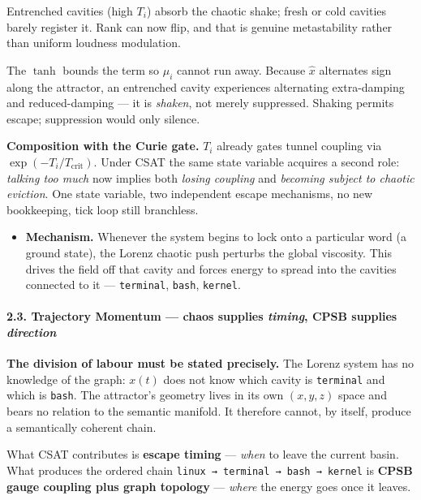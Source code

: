 \documentclass[
  11pt,
  a4paper,
]{article}
\providecommand{\tightlist}{%
  \setlength{\itemsep}{0pt}\setlength{\parskip}{0pt}}
\begin{document}
Entrenched cavities (high \(T_i\)) absorb the chaotic shake; fresh or
cold cavities barely register it. Rank can now flip, and that is genuine
metastability rather than uniform loudness modulation.

The \(\tanh\) bounds the term so \(\mu_i\) cannot run away. Because
\(\hat{x}\) alternates sign along the attractor, an entrenched cavity
experiences alternating extra-damping and reduced-damping --- it is
\emph{shaken}, not merely suppressed. Shaking permits escape;
suppression would only silence.

\textbf{Composition with the Curie gate.} \(T_i\) already gates tunnel
coupling via \(\exp(-T_i/T_{\text{crit}})\). Under CSAT the same state
variable acquires a second role: \emph{talking too much} now implies
both \emph{losing coupling} and \emph{becoming subject to chaotic
eviction}. One state variable, two independent escape mechanisms, no new
bookkeeping, tick loop still branchless.

\begin{itemize}
\tightlist
\item
  \textbf{Mechanism.} Whenever the system begins to lock onto a
  particular word (a ground state), the Lorenz chaotic push perturbs the
  global viscosity. This drives the field off that cavity and forces
  energy to spread into the cavities connected to it ---
  \texttt{terminal}, \texttt{bash}, \texttt{kernel}.
\end{itemize}

\paragraph{\texorpdfstring{2.3. Trajectory Momentum --- chaos supplies
\emph{timing}, CPSB supplies
\emph{direction}}{2.3. Trajectory Momentum --- chaos supplies timing, CPSB supplies direction}}\label{trajectory-momentum-chaos-supplies-timing-cpsb-supplies-direction}

\textbf{The division of labour must be stated precisely.} The Lorenz
system has no knowledge of the graph: \(x(t)\) does not know which
cavity is \texttt{terminal} and which is \texttt{bash}. The attractor's
geometry lives in its own \((x,y,z)\) space and bears no relation to the
semantic manifold. It therefore cannot, by itself, produce a
semantically coherent chain.

What CSAT contributes is \textbf{escape timing} --- \emph{when} to leave
the current basin. What produces the ordered chain
\texttt{linux\ →\ terminal\ →\ bash\ →\ kernel} is \textbf{CPSB gauge
coupling plus graph topology} --- \emph{where} the energy goes once it
leaves.
\end{document}
